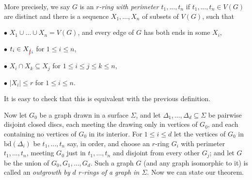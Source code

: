 More precisely, we say $G$ is an \textit{$r$-ring with perimeter $t_1, \dots, t_n$} if $t_1, \dots, t_n \in V(G)$ are distinct and there is a sequence $X_1, \dots, X_n$ of subsets of $V(G)$, such that

\hspace*{12pt}$\bullet$ $X_1 \cup \dots \cup X_n = V(G)$, and every edge of $G$ has both ends in some $X_i$,

\hspace*{12pt}$\bullet$ $t_i \in X_{\delm{1}\fix{i}}$ for $1 \le i \le n$,

\hspace*{12pt}$\bullet$ $X_i \cap X_k \subseteq X_j$ for $1 \le i \le j \le k \le n$,

\hspace*{12pt}$\bullet$ $|X_i| \le r$ for $1 \le i \le n$.

It is easy to check that this is equivalent with the previous definition.

Now let $G_0$ be a graph drawn in a surface $\Sigma$, and let $\Delta_1, \dots, \Delta_d \subseteq \Sigma$ be pairwise disjoint closed discs, each meeting the drawing only in vertices of $G_0$, and each containing no vertices of $G_0$ in its interior. For $1 \le i \le d$ let the vertices of $G_0$ in $\text{bd}(\Delta_i)$ be $t_1, \dots, t_n$ say, in order, and choose an $r$-ring $G_i$ with perimeter $t_1, \dots, t_n$, meeting $G_0$ just in $t_1, \dots, t_n$ and disjoint from every other $G_j$; and let $G$ be the union of $G_0, G_1, \dots, G_d$. Such a graph $G$ (and any graph isomorphic to it) is called an \textit{outgrowth by $d$ $r$-rings of a graph in $\Sigma$}. Now we can state our theorem.
